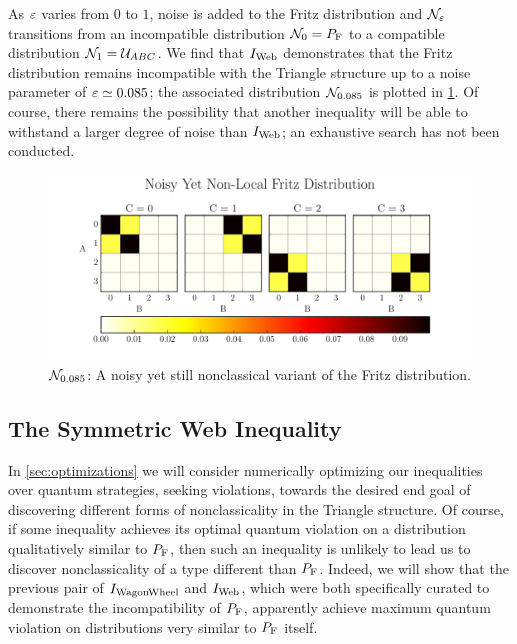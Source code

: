 \documentclass[aps, 10pt, english, twoside, pra, nofootinbib, tightenlines, longbibliography, superscriptaddress]{revtex4-1}
\begin{document}
    As $\varepsilon$ varies from $0$ to $1$, noise is added to the Fritz distribution and $\mathcal{N}_{\varepsilon}$ transitions from an incompatible distribution $\s{N}_{0} = \prob[\fritz]$ to a compatible distribution $\mathcal{N}_{1} = \mathcal{U}_{ABC}$. We find that $I_\text{Web}$ demonstrates that the Fritz distribution remains incompatible with the Triangle structure up to a noise parameter of $\varepsilon \simeq 0.085$; the associated distribution $\mathcal{N}_{0.085}$ is plotted in \cref{fig:noisy_fritz}. Of course, there remains the possibility that another inequality will be able to withstand a larger degree of noise than $I_\text{Web}$; an exhaustive search has not been conducted.

    \begin{figure}
    \begin{nscenter}
            \includegraphics{figure_noisy_yet_non_local_fritz.pdf}
            \caption{$\mathcal{N}_{0.085}$: A noisy yet still nonclassical variant of the Fritz distribution.}
            \label{fig:noisy_fritz}
    \end{nscenter}
    \end{figure}

    \subsection{The Symmetric Web Inequality}
    In \cref{sec:optimizations} we will consider numerically optimizing our inequalities over quantum strategies, seeking violations, towards the desired end goal of discovering different forms of nonclassicality in the Triangle structure. Of course, if some inequality achieves its optimal quantum violation on a distribution qualitatively similar to $\prob[\fritz]$, then such an inequality is unlikely to lead us to discover nonclassicality of a type different than $\prob[\fritz]$. Indeed, we will show that the previous pair of $I_\text{WagonWheel}$ and $I_\text{Web}$, which were both specifically curated to demonstrate the incompatibility of $\prob[\fritz]$, apparently achieve maximum quantum violation on distributions very similar to $\prob[\fritz]$ itself.
\end{document}
